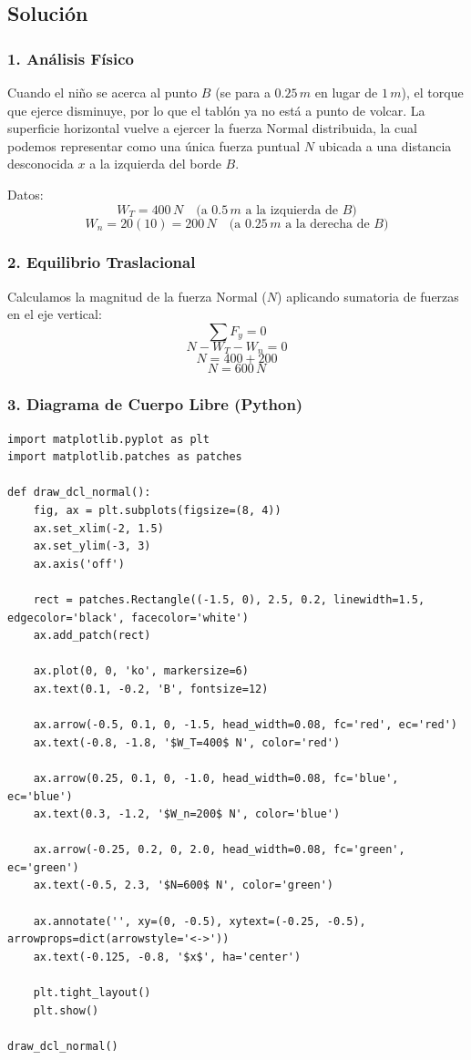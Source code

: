\documentclass[12pt, a4paper]{article}
\begin{document}
\subsection*{Solución}

\subsubsection*{1. Análisis Físico}
Cuando el niño se acerca al punto $B$ (se para a $0.25 \, \si{m}$ en lugar de $1 \, \si{m}$), el torque que ejerce disminuye, por lo que el tablón ya no está a punto de volcar. La superficie horizontal vuelve a ejercer la fuerza Normal distribuida, la cual podemos representar como una única fuerza puntual $N$ ubicada a una distancia desconocida $x$ a la izquierda del borde $B$.

Datos:
$$W_T = 400 \, \si{N} \quad \text{(a } 0.5 \, \si{m} \text{ a la izquierda de } B \text{)}$$
$$W_n = 20(10) = 200 \, \si{N} \quad \text{(a } 0.25 \, \si{m} \text{ a la derecha de } B \text{)}$$

\subsubsection*{2. Equilibrio Traslacional}
Calculamos la magnitud de la fuerza Normal ($N$) aplicando sumatoria de fuerzas en el eje vertical:
$$\sum F_y = 0$$
$$N - W_T - W_n = 0$$
$$N = 400 + 200$$
$$N = 600 \, \si{N}$$

\subsubsection*{3. Diagrama de Cuerpo Libre (Python)}

\begin{lstlisting}
import matplotlib.pyplot as plt
import matplotlib.patches as patches

def draw_dcl_normal():
    fig, ax = plt.subplots(figsize=(8, 4))
    ax.set_xlim(-2, 1.5)
    ax.set_ylim(-3, 3)
    ax.axis('off')

    rect = patches.Rectangle((-1.5, 0), 2.5, 0.2, linewidth=1.5, edgecolor='black', facecolor='white')
    ax.add_patch(rect)

    ax.plot(0, 0, 'ko', markersize=6)
    ax.text(0.1, -0.2, 'B', fontsize=12)

    ax.arrow(-0.5, 0.1, 0, -1.5, head_width=0.08, fc='red', ec='red')
    ax.text(-0.8, -1.8, '$W_T=400$ N', color='red')
    
    ax.arrow(0.25, 0.1, 0, -1.0, head_width=0.08, fc='blue', ec='blue')
    ax.text(0.3, -1.2, '$W_n=200$ N', color='blue')

    ax.arrow(-0.25, 0.2, 0, 2.0, head_width=0.08, fc='green', ec='green')
    ax.text(-0.5, 2.3, '$N=600$ N', color='green')

    ax.annotate('', xy=(0, -0.5), xytext=(-0.25, -0.5), arrowprops=dict(arrowstyle='<->'))
    ax.text(-0.125, -0.8, '$x$', ha='center')

    plt.tight_layout()
    plt.show()

draw_dcl_normal()
\end{lstlisting}
\end{document}
